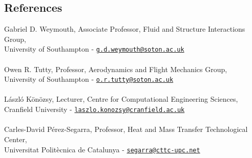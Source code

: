 \documentclass[line]{res}
\newenvironment{p}
  {\begin{adjustwidth}{-10pt}{0pt}}
  {\end{adjustwidth}}
\begin{document}
\begin{resume}
\section{ References}
\begin{p}
Gabriel D. Weymouth, Associate Professor, Fluid and Structure Interactions Group, \\ University of Southampton - \href{mailto:g.d.weymouth@soton.ac.uk}{\texttt{g.d.weymouth@soton.ac.uk}}\\
\\
Owen R. Tutty, Professor, Aerodynamics and Flight Mechanics Group, \\ University of Southampton - \href{mailto:o.r.tutty@soton.ac.uk}{\texttt{o.r.tutty@soton.ac.uk}} \\
\\
L\'{a}szl\'{o} K\"{o}n\"{o}zsy, Lecturer, Centre for Computational Engineering Sciences, \\ Cranfield University - \href{mailto:laszlo.konozsy@cranfield.ac.uk}{\texttt{laszlo.konozsy@cranfield.ac.uk}} \\
\\
Carles-David P\'{e}rez-Segarra, Professor, Heat and Mass Transfer Technological Center, \\ Universitat Polit\`{e}cnica de Catalunya - \href{mailto:segarra@cttc-upc.net}{\texttt{segarra@cttc-upc.net}}
\end{p}




\end{resume}
\end{document}
